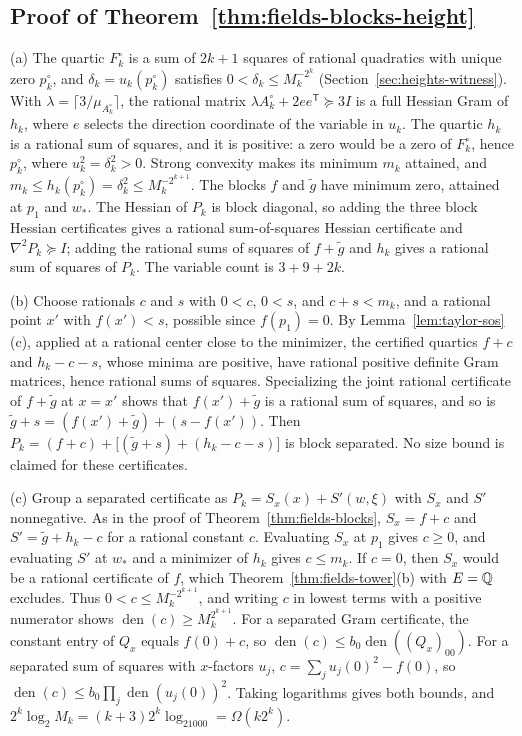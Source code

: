 \subsection{Proof of Theorem~\ref{thm:fields-blocks-height}}
\label{app:fields-blocks}

(a) The quartic $F_k^\circ$ is a sum of $2k+1$ squares of rational
quadratics with unique zero $p_k^\circ$, and $\delta_k=u_k(p_k^\circ)$ satisfies
$0<\delta_k\le M_k^{-2^k}$ (Section~\ref{sec:heights-witness}). With
$\lambda=\lceil3/\mu_{A_k^\circ}\rceil$, the rational matrix
$\lambda A_k^\circ+2ee^{\mathsf T}\succeq3I$ is a full Hessian Gram of $h_k$,
where $e$ selects the direction coordinate of the variable in $u_k$. The
quartic $h_k$ is a rational sum of squares, and it is positive: a zero would
be a zero of $F_k^\circ$, hence $p_k^\circ$, where $u_k^2=\delta_k^2>0$. Strong
convexity makes its minimum $m_k$ attained, and
$m_k\le h_k(p_k^\circ)=\delta_k^2\le M_k^{-2^{k+1}}$. The blocks $f$ and $\tilde g$
have minimum zero, attained at $p_1$ and $w_*$. The Hessian of $P_k$ is block
diagonal, so adding the three block Hessian certificates gives a rational
sum-of-squares Hessian certificate and $\nabla^2P_k\succeq I$; adding the
rational sums of squares of $f+\tilde g$ and $h_k$ gives a rational sum of
squares of $P_k$. The variable count is $3+9+2k$.

(b) Choose rationals $c$ and $s$ with $0<c$, $0<s$, and $c+s<m_k$, and a
rational point $x'$ with $f(x')<s$, possible since $f(p_1)=0$. By
Lemma~\ref{lem:taylor-sos}(c), applied at a rational center close to the
minimizer, the certified quartics $f+c$ and $h_k-c-s$, whose minima are
positive, have rational positive definite Gram matrices, hence rational sums of
squares. Specializing the joint rational certificate of $f+\tilde g$ at
$x=x'$ shows that $f(x')+\tilde g$ is a rational sum of squares, and so is
$\tilde g+s=(f(x')+\tilde g)+(s-f(x'))$. Then
$P_k=(f+c)+\bigl[(\tilde g+s)+(h_k-c-s)\bigr]$ is block separated. No size
bound is claimed for these certificates.

(c) Group a separated certificate as $P_k=S_x(x)+S'(w,\xi)$ with $S_x$ and
$S'$ nonnegative. As in the proof of Theorem~\ref{thm:fields-blocks},
$S_x=f+c$ and $S'=\tilde g+h_k-c$ for a rational constant $c$. Evaluating
$S_x$ at $p_1$ gives $c\ge0$, and evaluating $S'$ at $w_*$ and a minimizer of
$h_k$ gives $c\le m_k$. If $c=0$, then $S_x$ would be a rational certificate
of $f$, which Theorem~\ref{thm:fields-tower}(b) with $E=\mathbb Q$ excludes. Thus
$0<c\le M_k^{-2^{k+1}}$, and writing $c$ in lowest terms with a positive
numerator shows $\operatorname{den}(c)\ge M_k^{2^{k+1}}$. For a separated Gram
certificate, the constant entry of $Q_x$ equals $f(0)+c$, so
$\operatorname{den}(c)\le b_0\operatorname{den}((Q_x)_{00})$. For a separated
sum of squares with $x$-factors $u_j$, $c=\sum_ju_j(0)^2-f(0)$, so
$\operatorname{den}(c)\le b_0\prod_j\operatorname{den}(u_j(0))^2$. Taking
logarithms gives both bounds, and
$2^k\log_2M_k=(k+3)2^k\log_21000=\Omega(k2^k)$.

